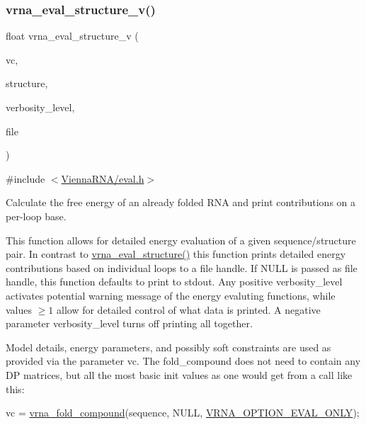 \subsubsection{\texorpdfstring{vrna\+\_\+eval\+\_\+structure\+\_\+v()}{vrna\_eval\_structure\_v()}}
{\footnotesize\ttfamily float vrna\+\_\+eval\+\_\+structure\+\_\+v (\begin{DoxyParamCaption}\item[{\mbox{\hyperlink{group__fold__compound_ga1b0cef17fd40466cef5968eaeeff6166}{vrna\+\_\+fold\+\_\+compound\+\_\+t}} $\ast$}]{vc,  }\item[{const char $\ast$}]{structure,  }\item[{int}]{verbosity\+\_\+level,  }\item[{F\+I\+LE $\ast$}]{file }\end{DoxyParamCaption})}



{\ttfamily \#include $<$\mbox{\hyperlink{eval_8h}{Vienna\+R\+N\+A/eval.\+h}}$>$}



Calculate the free energy of an already folded R\+NA and print contributions on a per-\/loop base. 

This function allows for detailed energy evaluation of a given sequence/structure pair. In contrast to \mbox{\hyperlink{group__eval_ga58f199f1438d794a265f3b27fc8ea631}{vrna\+\_\+eval\+\_\+structure()}} this function prints detailed energy contributions based on individual loops to a file handle. If N\+U\+LL is passed as file handle, this function defaults to print to stdout. Any positive {\ttfamily verbosity\+\_\+level} activates potential warning message of the energy evaluting functions, while values $ \ge 1 $ allow for detailed control of what data is printed. A negative parameter {\ttfamily verbosity\+\_\+level} turns off printing all together.

Model details, energy parameters, and possibly soft constraints are used as provided via the parameter \textquotesingle{}vc\textquotesingle{}. The fold\+\_\+compound does not need to contain any DP matrices, but all the most basic init values as one would get from a call like this\+: 
\begin{DoxyCode}
vc = \mbox{\hyperlink{group__fold__compound_ga6601d994ba32b11511b36f68b08403be}{vrna\_fold\_compound}}(sequence, NULL, \mbox{\hyperlink{group__fold__compound_ga61469c423131552c8483229f8b6c7e0e}{VRNA\_OPTION\_EVAL\_ONLY}});
\end{DoxyCode}


